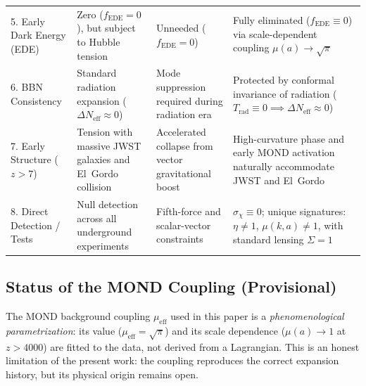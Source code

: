 \documentclass[aps,prd,twocolumn,superscriptaddress,nofootinbib,floatfix]{revtex4-2}
\begin{document}
\begin{table}[t]
\begin{tabular}{@{}llll@{}}
\addlinespace
\parbox[t]{0.17\textwidth}{\raggedright 5. Early Dark Energy (EDE)} &
\parbox[t]{0.25\textwidth}{\raggedright Zero ($f_{\mathrm{EDE}} = 0$), but subject to Hubble tension} &
\parbox[t]{0.26\textwidth}{\raggedright Unneeded ($f_{\mathrm{EDE}} = 0$)} &
\parbox[t]{0.26\textwidth}{\raggedright Fully eliminated ($f_{\mathrm{EDE}} \equiv 0$) via scale-dependent coupling $\mu(a) \to \sqrt{\pi}$} \\
\addlinespace
\parbox[t]{0.17\textwidth}{\raggedright 6. BBN Consistency} &
\parbox[t]{0.25\textwidth}{\raggedright Standard radiation expansion ($\Delta N_{\mathrm{eff}} \approx 0$)} &
\parbox[t]{0.26\textwidth}{\raggedright Mode suppression required during radiation era} &
\parbox[t]{0.26\textwidth}{\raggedright Protected by conformal invariance of radiation ($T_{\mathrm{rad}} \equiv 0 \implies \Delta N_{\mathrm{eff}} \approx 0$)} \\
\addlinespace
\parbox[t]{0.17\textwidth}{\raggedright 7. Early Structure ($z > 7$)} &
\parbox[t]{0.25\textwidth}{\raggedright Tension with massive JWST galaxies and El~Gordo collision} &
\parbox[t]{0.26\textwidth}{\raggedright Accelerated collapse from vector gravitational boost} &
\parbox[t]{0.26\textwidth}{\raggedright High-curvature phase and early MOND activation naturally accommodate JWST and El~Gordo} \\
\addlinespace
\parbox[t]{0.17\textwidth}{\raggedright 8. Direct Detection / Tests} &
\parbox[t]{0.25\textwidth}{\raggedright Null detection across all underground experiments} &
\parbox[t]{0.26\textwidth}{\raggedright Fifth-force and scalar-vector constraints} &
\parbox[t]{0.26\textwidth}{\raggedright $\sigma_{\chi} \equiv 0$; unique signatures: $\eta \neq 1$, $\mu(k,a) \neq 1$, with standard lensing $\Sigma = 1$} \\
\bottomrule
\end{tabular}
\end{table}


\subsection{Status of the MOND Coupling (Provisional)}
\label{subsec:mond_status}

The MOND background coupling $\mu_{\mathrm{eff}}$ used in this paper is a \emph{phenomenological parametrization}: its value ($\mu_{\mathrm{eff}} = \sqrt{\pi}$) and its scale dependence ($\mu(a) \to 1$ at $z > 4000$) are fitted to the data, not derived from a Lagrangian. This is an honest limitation of the present work: the coupling reproduces the correct expansion history, but its physical origin remains open.
\end{document}
